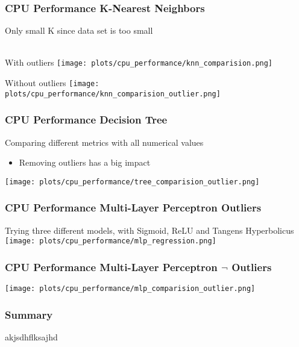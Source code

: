 \documentclass[aspectratio=169]{beamer}
\begin{document}
\begin{frame}{}
\frametitle{CPU Performance K-Nearest Neighbors}
\center Only small K since data set is too small\\ ~\\
\begin{minipage}{0.49\textwidth}
\center With outliers
   \texttt{[image: plots/cpu\_performance/knn\_comparision.png]}
\end{minipage}
 \begin{minipage}{0.49\textwidth}
 \center Without outliers
   \texttt{[image: plots/cpu\_performance/knn\_comparision\_outlier.png]}
\end{minipage}
\end{frame}

\begin{frame}{}
\frametitle{CPU Performance Decision Tree}
\center Comparing different metrics with all numerical values\\
\begin{minipage}{0.3\textwidth}
	\begin{itemize}
	\item Removing outliers has a big impact
	\end{itemize}
\end{minipage}
\begin{minipage}{0.69\textwidth}
  \center \texttt{[image: plots/cpu\_performance/tree\_comparision\_outlier.png]}
\end{minipage}
\end{frame}

\begin{frame}{}
\frametitle{CPU Performance Multi-Layer Perceptron Outliers}
\center Trying three different models, with Sigmoid, ReLU and Tangens Hyperbolicus
    \center \texttt{[image: plots/cpu\_performance/mlp\_regression.png]}
\end{frame}

\begin{frame}{}
\frametitle{CPU Performance Multi-Layer Perceptron $\neg$ Outliers}
    \center \texttt{[image: plots/cpu\_performance/mlp\_comparision\_outlier.png]}
\end{frame}

\begin{frame}{}
\frametitle{Summary}
akjsdhflksajhd
\end{frame}


\end{document}
